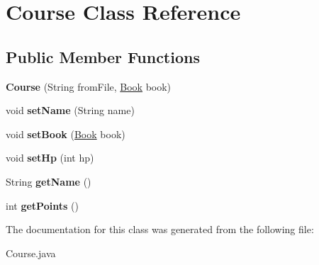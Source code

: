 \hypertarget{class_course}{}\section{Course Class Reference}
\label{class_course}
\subsection*{Public Member Functions}
\begin{DoxyCompactItemize}
\item 
\hypertarget{class_course_abffaf470e0eacdbda2f8e017844f0e36}{}{\bfseries Course} (String from\+File, \hyperlink{class_book}{Book} book)\label{class_course_abffaf470e0eacdbda2f8e017844f0e36}

\item 
\hypertarget{class_course_aa5c333f262e48fd3812814539104ec10}{}void {\bfseries set\+Name} (String name)\label{class_course_aa5c333f262e48fd3812814539104ec10}

\item 
\hypertarget{class_course_aa2c7624b7ad8e9a7005c615dbb43ed9e}{}void {\bfseries set\+Book} (\hyperlink{class_book}{Book} book)\label{class_course_aa2c7624b7ad8e9a7005c615dbb43ed9e}

\item 
\hypertarget{class_course_ae9baad64cf5aec001523fbecb1ee8de7}{}void {\bfseries set\+Hp} (int hp)\label{class_course_ae9baad64cf5aec001523fbecb1ee8de7}

\item 
\hypertarget{class_course_a246738ee9b960276574bca77b96f896c}{}String {\bfseries get\+Name} ()\label{class_course_a246738ee9b960276574bca77b96f896c}

\item 
\hypertarget{class_course_ab769423a99e2e1ebf839837ddf16cb47}{}int {\bfseries get\+Points} ()\label{class_course_ab769423a99e2e1ebf839837ddf16cb47}

\end{DoxyCompactItemize}


The documentation for this class was generated from the following file\+:\begin{DoxyCompactItemize}
\item 
Course.\+java\end{DoxyCompactItemize}
